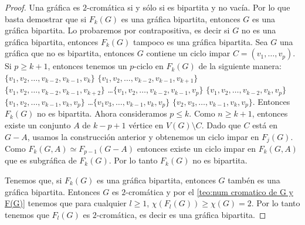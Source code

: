 \begin{proof}
    Una gr\'afica es $2$-crom\'atica si y s\'olo si es bipartita y no
    vac\'ia. Por lo que basta demostrar que si $F_k(G)$ es una gr\'afica
    bipartita, entonces $G$ es una gr\'afica bipartita. Lo probaremos por
    contrapositiva, es decir si $G$ no es una gr\'afica bipartita, entonces
    $F_k(G)$ tampoco es una gr\'afica bipartita. Sea $G$ una gr\'afica que
    no es bipartita, entonces $G$ contiene un ciclo impar $C=(v_1, \dots,
    v_p)$. Si $p \geq k+1$, entonces tenemos un $p$-ciclo en $F_k(G)$ de la
    siguiente manera: $\{v_1, v_2, \dots, v_{k-2}, v_{k-1}, v_k\}$ $\{v_1,
    v_2, \dots, v_{k-2}, v_{k-1}, v_{k+1}\}$ $\{v_1, v_2, \dots, v_{k-2},
    v_{k-1}, v_{k+2}\}$ \dots $\{v_1, v_2, \dots, v_{k-2}, v_{k-1}, v_p\}$
    $\{v_1, v_2, \dots, v_{k-2}, v_k, v_p\}$ $\{v_1, v_2, \dots, v_{k-1},
    v_k, v_p\}$ \dots $\{v_1 v_3, \dots, v_{k-1}, v_k, v_p\}$ $\{v_2, v_3,
    \dots, v_{k-1}, v_k, v_p\}$. Entonces $F_k(G)$ no es bipartita. Ahora
    consideramos $p \leq k$. Como $n \geq k+1$, entonces existe un conjunto
    $A$ de $k-p+1$ v\'ertice en $V(G)\setminus C$. Dado que $C$ est\'a en $G
    -A$, usamos la construcci\'on anterior y obtenemos un ciclo impar en
    $F_j(G)$. Como $F_k(G,A) \simeq F_{p-1}(G-A)$ entonces existe un ciclo
    impar en $F_k(G,A)$ que es subgr\'afica de $F_k(G)$. Por lo tanto
    $F_k(G)$ no es bipartita.

    Tenemos que, si $F_k(G)$ es una gr\'afica bipartita, entonces $G$
    tamb\'en es una gr\'afica bipartita. Entonces $G$ es $2$-crom\'atica y
    por el \cref{teo:num cromatico de G y F(G)} tenemos que para cualquier $l\geq 1$, $\chi
    (F_l(G)) \geq \chi (G)=2$. Por lo tanto tenemos que $F_l(G)$ es
    $2$-crom\'atica, es decir es una gr\'afica bipartita.
\end{proof}


